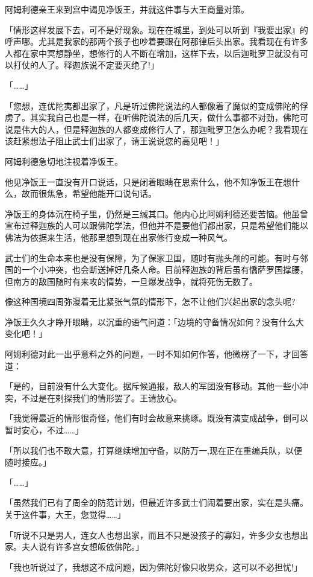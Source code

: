 \documentclass[twoside,openany]{book}
\begin{document}
阿姆利德亲王来到宫中谒见净饭王，并就这件事与大王商量对策。

「情形这样发展下去，可不是好现象。现在在城里，到处可以听到『我要出家』的呼声哪。尤其是我家的那两个孩子也吵着要跟在阿那律后头出家。我看现在有许多人都在家中冥想静坐，想修行的人不断在增加，这样下去，以后迦毗罗卫就没有可以打仗的人了。释迦族说不定要灭绝了!」

「……」

「您想，连优陀夷都出家了，凡是听过佛陀说法的人都像着了魔似的变成佛陀的俘虏了。其实我自己也是一样，在听佛陀说法的后几天，做什么事都不对劲，佛陀可说是伟大的人，但是释迦族的人都变成修行人了，那迦毗罗卫怎么办呢？我看现在该赶紧想法子阻止武士们出家了，请王说说您的高见吧！」

阿姆利德急切地注视着净饭王。

他见净饭王一直没有开口说话，只是闭着眼睛在思索什么，他不知净饭王在想什么，故而很焦急，希望他能开口说句话。

净饭王的身体沉在椅子里，仍然是三缄其口。他内心比阿姆利德还要苦恼。他虽曾宣布过释迦族的人可以跟佛陀学法，但他并不是要他们都出家，只是希望他们能以佛法为依据来生活，他那里想到现在出家修行变成一种风气。

武士们的生命本来也是没有保障，为了保家卫国，随时有抛头颅的可能。有时与邻国的一个小冲突，也会断送掉好几条人命。目前释迦族的背后虽有憍萨罗国撑腰，但南方的敌国随时有来攻的情势，一旦爆发战争，就将死伤无数了。

像这种国境四周弥漫着无比紧张气氛的情形下，怎不让他们兴起出家的念头呢?

净饭王久久才睁开眼睛，以沉重的语气问道：「边境的守备情况如何？没有什么大变化吧！」

阿姆利德对此一出乎意料之外的问题，一时不知如何作答，他微楞了一下，才回答道：

「是的，目前没有什么大变化。据斥候通报，敌人的军团没有移动。其他一些小冲突，不过是在剌探我们的情形罢了。王请放心。

「我觉得最近的情形很奇怪，他们有时会故意来挑琢。既没有演变成战争，倒可以暂时安心，不过……」

「所以我们也不敢大意，打算继续增加守备，以防万一,现在正在重编兵队，以便随时接应。」

「……」

「虽然我们已有了周全的防范计划，但最近许多武士们闹着要出家，实在是头痛。关于这件事，大王，您觉得……」

「听说不只是男人，连女人也想出家，而且不只是没孩子的寡妇，许多少女也想出家。夫人说有许多宫女想皈依佛陀。」

「我也听说过了，我想这不成问题，因为佛陀好像只收男众，这可以不必担忧!」
\end{document}
